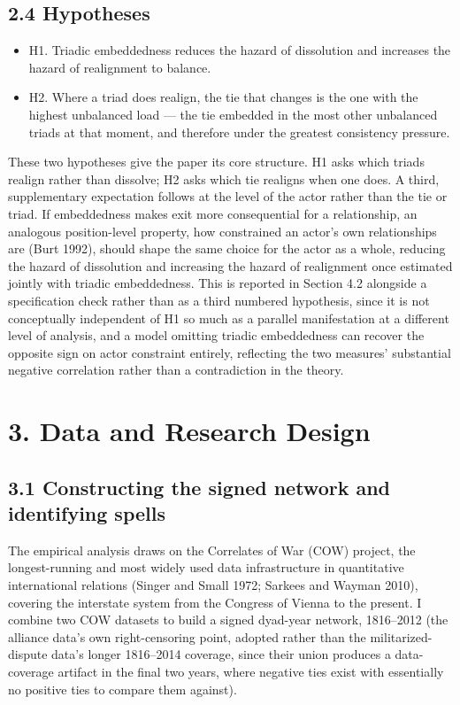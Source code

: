 \documentclass[Afour,sageh,times,doublespace]{sagej}
\begin{document}
\subsection*{2.4 Hypotheses}

\begin{itemize}
\item H1. Triadic embeddedness reduces the hazard of dissolution and increases the hazard of realignment to balance.
\item H2. Where a triad does realign, the tie that changes is the one with the highest unbalanced load --- the tie embedded in the most other unbalanced triads at that moment, and therefore under the greatest consistency pressure.
\end{itemize}

These two hypotheses give the paper its core structure. H1 asks which triads realign rather than dissolve; H2 asks which tie realigns when one does. A third, supplementary expectation follows at the level of the actor rather than the tie or triad. If embeddedness makes exit more consequential for a relationship, an analogous position-level property, how constrained an actor's own relationships are (Burt 1992), should shape the same choice for the actor as a whole, reducing the hazard of dissolution and increasing the hazard of realignment once estimated jointly with triadic embeddedness. This is reported in Section 4.2 alongside a specification check rather than as a third numbered hypothesis, since it is not conceptually independent of H1 so much as a parallel manifestation at a different level of analysis, and a model omitting triadic embeddedness can recover the opposite sign on actor constraint entirely, reflecting the two measures' substantial negative correlation rather than a contradiction in the theory.

\section*{3. Data and Research Design}

\subsection*{3.1 Constructing the signed network and identifying spells}

The empirical analysis draws on the Correlates of War (COW) project, the longest-running and most widely used data infrastructure in quantitative international relations (Singer and Small 1972; Sarkees and Wayman 2010), covering the interstate system from the Congress of Vienna to the present. I combine two COW datasets to build a signed dyad-year network, 1816--2012 (the alliance data's own right-censoring point, adopted rather than the militarized-dispute data's longer 1816--2014 coverage, since their union produces a data-coverage artifact in the final two years, where negative ties exist with essentially no positive ties to compare them against).
\end{document}
